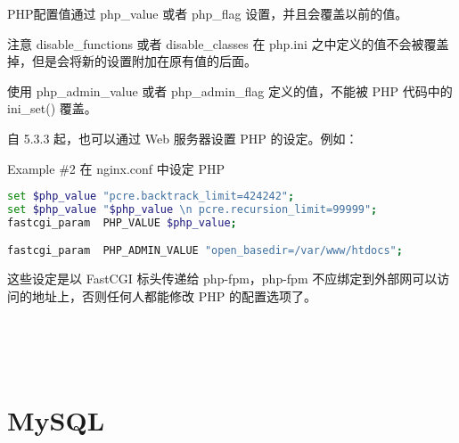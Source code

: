 PHP配置值通过 php\_value 或者 php\_flag 设置，并且会覆盖以前的值。

注意 disable\_functions 或者 disable\_classes 在 php.ini 之中定义的值不会被覆盖掉，但是会将新的设置附加在原有值的后面。

使用 php\_admin\_value 或者 php\_admin\_flag 定义的值，不能被 PHP 代码中的 ini\_set() 覆盖。

自 5.3.3 起，也可以通过 Web 服务器设置 PHP 的设定。例如：

Example \#2 在 nginx.conf 中设定 PHP

\begin{lstlisting}[language=bash]
set $php_value "pcre.backtrack_limit=424242";
set $php_value "$php_value \n pcre.recursion_limit=99999";
fastcgi_param  PHP_VALUE $php_value;

fastcgi_param  PHP_ADMIN_VALUE "open_basedir=/var/www/htdocs";
\end{lstlisting}


这些设定是以 FastCGI 标头传递给 php-fpm，php-fpm 不应绑定到外部网可以访问的地址上，否则任何人都能修改 PHP 的配置选项了。

\begin{lstlisting}[language=bash]

\end{lstlisting}



\begin{lstlisting}[language=bash]

\end{lstlisting}




\begin{lstlisting}[language=bash]

\end{lstlisting}




\begin{lstlisting}[language=bash]

\end{lstlisting}




\begin{lstlisting}[language=bash]

\end{lstlisting}




\section{MySQL}








